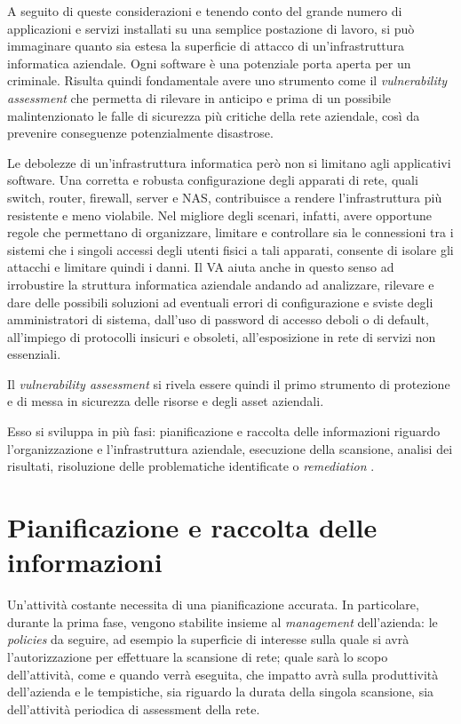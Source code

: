 \documentclass[target=bach,aauheader=]{thud}
\begin{document}
A seguito di queste considerazioni e tenendo conto del grande numero di applicazioni e servizi installati su una semplice postazione di lavoro, si può immaginare quanto sia estesa la superficie di attacco di un’infrastruttura informatica aziendale. Ogni software è una potenziale porta aperta per un criminale. Risulta quindi fondamentale avere uno strumento come il \textit{vulnerability assessment} che permetta di rilevare in anticipo e prima di un possibile malintenzionato le falle di sicurezza più critiche della rete aziendale, così da prevenire conseguenze potenzialmente disastrose.

Le debolezze di un’infrastruttura informatica però non si limitano agli applicativi software. Una corretta e robusta configurazione degli apparati di rete, quali switch, router, firewall, server e NAS, contribuisce a rendere l’infrastruttura più resistente e meno violabile. Nel migliore degli scenari, infatti, avere opportune regole che permettano di organizzare, limitare e controllare sia le connessioni tra i sistemi che i singoli accessi degli utenti fisici a tali apparati, consente di isolare gli attacchi e limitare quindi i danni. Il VA aiuta anche in questo senso ad irrobustire la struttura informatica aziendale andando ad analizzare, rilevare e dare delle possibili soluzioni ad eventuali errori di configurazione e sviste degli amministratori di sistema, dall’uso di password di accesso deboli o di default, all’impiego di protocolli insicuri e obsoleti, all’esposizione in rete di servizi non essenziali.

Il \textit{vulnerability assessment} si rivela essere quindi il primo strumento di protezione e di messa in sicurezza delle risorse e degli asset aziendali.

Esso si sviluppa in più fasi: pianificazione e raccolta delle informazioni riguardo l’organizzazione e l’infrastruttura aziendale, esecuzione della scansione, analisi dei risultati, risoluzione delle problematiche identificate o \textit{remediation} \cite{netvul}.


\section{Pianificazione e raccolta delle informazioni}
Un’attività costante necessita di una pianificazione accurata. In particolare, durante la prima fase, vengono stabilite insieme al \textit{management} dell’azienda: le \textit{policies} da seguire, ad esempio la superficie di interesse sulla quale si avrà l’autorizzazione per effettuare la scansione di rete; quale sarà lo scopo dell’attività, come e quando verrà eseguita, che impatto avrà sulla produttività dell’azienda e le tempistiche, sia riguardo la durata della singola scansione, sia dell’attività periodica di assessment della rete.
\end{document}
